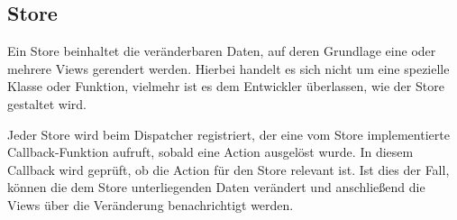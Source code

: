 \subsection{Store}
\label{ssec:gf_store}

Ein Store beinhaltet die veränderbaren Daten, auf deren Grundlage eine oder
mehrere Views gerendert werden.  Hierbei handelt es sich nicht um eine spezielle
Klasse oder Funktion, vielmehr ist es dem Entwickler überlassen, wie der Store
gestaltet wird.

Jeder Store wird beim Dispatcher registriert, der eine vom Store implementierte
Callback-Funktion aufruft, sobald eine Action ausgelöst wurde.  In diesem
Callback wird geprüft, ob die Action für den Store relevant ist.  Ist dies der
Fall, können die dem Store unterliegenden Daten verändert und anschließend die
Views über die Veränderung benachrichtigt werden.
